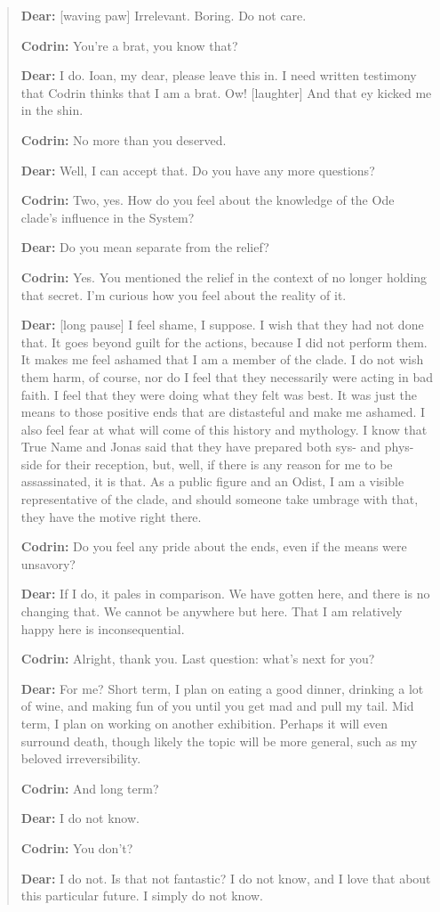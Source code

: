 \begin{quote}
\textbf{Dear:} {[}waving paw{]} Irrelevant. Boring. Do not care.

\textbf{Codrin:} You're a brat, you know that?

\textbf{Dear:} I do. Ioan, my dear, please leave this in. I need written testimony that Codrin thinks that I am a brat. Ow! {[}laughter{]} And that ey kicked me in the shin.

\textbf{Codrin:} No more than you deserved.

\textbf{Dear:} Well, I can accept that. Do you have any more questions?

\textbf{Codrin:} Two, yes. How do you feel about the knowledge of the Ode clade's influence in the System?

\textbf{Dear:} Do you mean separate from the relief?

\textbf{Codrin:} Yes. You mentioned the relief in the context of no longer holding that secret. I'm curious how you feel about the reality of it.

\textbf{Dear:} {[}long pause{]} I feel shame, I suppose. I wish that they had not done that. It goes beyond guilt for the actions, because I did not perform them. It makes me feel ashamed that I am a member of the clade. I do not wish them harm, of course, nor do I feel that they necessarily were acting in bad faith. I feel that they were doing what they felt was best. It was just the means to those positive ends that are distasteful and make me ashamed. I also feel fear at what will come of this history and mythology. I know that True Name and Jonas said that they have prepared both sys- and phys-side for their reception, but, well, if there is any reason for me to be assassinated, it is that. As a public figure and an Odist, I am a visible representative of the clade, and should someone take umbrage with that, they have the motive right there.

\textbf{Codrin:} Do you feel any pride about the ends, even if the means were unsavory?

\textbf{Dear:} If I do, it pales in comparison. We have gotten here, and there is no changing that. We cannot be anywhere but here. That I am relatively happy here is inconsequential.

\textbf{Codrin:} Alright, thank you. Last question: what's next for you?

\textbf{Dear:} For me? Short term, I plan on eating a good dinner, drinking a lot of wine, and making fun of you until you get mad and pull my tail. Mid term, I plan on working on another exhibition. Perhaps it will even surround death, though likely the topic will be more general, such as my beloved irreversibility.

\textbf{Codrin:} And long term?

\textbf{Dear:} I do not know.

\textbf{Codrin:} You don't?

\textbf{Dear:} I do not. Is that not fantastic? I do not know, and I love that about this particular future. I simply do not know.
\end{quote}
